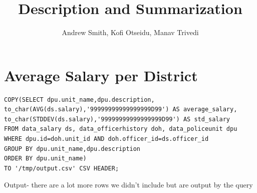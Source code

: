 \documentclass{article}
\title{Description and Summarization}
\author{Andrew Smith, Kofi Otseidu, Manav Trivedi}
\begin{document}
\maketitle

\section{Average Salary per District}

\begin{lstlisting}[frame=single]
COPY(SELECT dpu.unit_name,dpu.description, 
to_char(AVG(ds.salary),'99999999999999999D99') AS average_salary,
to_char(STDDEV(ds.salary),'99999999999999999D99') AS std_salary
FROM data_salary ds, data_officerhistory doh, data_policeunit dpu
WHERE dpu.id=doh.unit_id AND doh.officer_id=ds.officer_id
GROUP BY dpu.unit_name,dpu.description
ORDER BY dpu.unit_name)
TO '/tmp/output.csv' CSV HEADER;
\end{lstlisting}
\begin{center} Output- there are a lot more rows we didn't include but are output by the query
\end{center}
\end{document}
